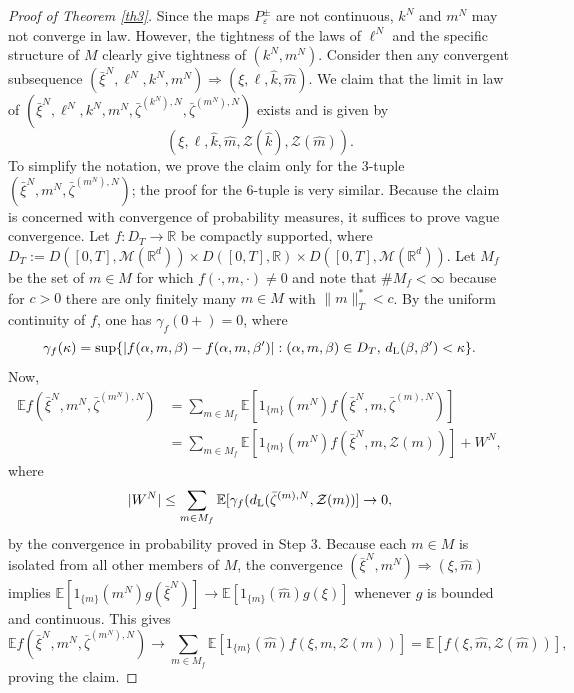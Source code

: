 \documentclass[11pt]{amsart}
\theoremstyle{plain}
\newcommand{\eps}{\varepsilon}
\newcommand{\al}{\alpha}
\newcommand{\gam}{\gamma}
\newcommand{\kap}{\kappa}
\newcommand{\R}{{\mathbb R}}
\newcommand{\EE}{{\mathbb E}}
\newcommand{\E}{{\mathbb E}}
\newcommand{\calM}{{\mathcal M}}
\newcommand{\calZ}{{\mathcal Z}}
\newcommand{\To}{\Rightarrow}
\newcommand{\iy}{\infty}
\begin{document}
\begin{proof}[Proof of Theorem \ref{th3}]

Since the maps $P^\pm_\eps$ are not continuous,
$k^N$ and $m^N$ may not converge in law. However, the tightness
of the laws of $\ell^N$ and the specific structure of $M$
clearly give tightness of $(k^N,m^N)$. Consider then any convergent subsequence
$(\bar\xi^N,\ell^N,k^N,m^N)\To(\xi,\ell,\hat k,\hat m)$.
We claim that the limit in law of
$(\bar\xi^N,\ell^N,k^N,m^N,\bar\zeta^{(k^N),N},\bar\zeta^{(m^N),N})$
exists and is given by
\[
(\xi,\ell,\hat k,\hat m,\calZ(\hat k),\calZ(\hat m)).
\]
To simplify the notation, we prove the claim only for the 3-tuple
$(\bar\xi^N,m^N,\bar\zeta^{(m^N),N})$;
the proof for the 6-tuple is very similar.
Because the claim is concerned with convergence
of probability measures, it suffices to prove vague convergence.
Let $f:D_T\to\R$ be compactly supported, where
$D_T:=D([0,T],\calM(\R^d))\times D([0,T],\R)\times D([0,T],\calM(\R^d))$.
Let $M_f$ be the set of $m\in M$ for which $f(\cdot,m,\cdot)\ne0$
and note that $\# M_f<\iy$ because
for $c>0$ there are only finitely many $m\in M$ with
$\|m\|^*_T<c$. By the uniform continuity of $f$, one has
$\gam_f(0+)=0$, where
\[
\gam_f(\kap)=\sup\{|f(\al,m,\beta)-f(\al,m,\beta')|:
(\al,m,\beta)\in D_T,\,d_{\rm L}(\beta,\beta')<\kap\}.
\]
Now,
\begin{align*}
\E f(\bar\xi^N,m^N,\bar\zeta^{(m^N),N})
&=\sum_{m\in M_f}\E[1_{\{m\}}(m^N) f(\bar\xi^N,m,\bar\zeta^{(m),N})]
\\
&=
\sum_{m\in M_f}\E[1_{\{m\}}(m^N) f(\bar\xi^N,m,\calZ(m))]
+W^N,
\end{align*}
where
\[
|W^N|\le\sum_{m\in M_f}\EE[\gam_f(d_{\rm L}(\bar\zeta^{(m),N},
\calZ(m))]\to0,
\]
by the convergence in probability proved in Step 3.
Because each $m\in M$ is isolated from all other members of $M$,
the convergence $(\bar\xi^N,m^N)\To(\xi,\hat m)$
implies $\E[1_{\{m\}}(m^N)g(\bar\xi^N)]
\to\E[1_{\{m\}}(\hat m)g(\xi)]$ whenever $g$ is bounded and continuous.
This gives
\[
\E f(\bar\xi^N,m^N,\bar\zeta^{(m^N),N})
\to\sum_{m\in M_f}\E[1_{\{m\}}(\hat m)f(\xi,m,\calZ(m))]
=\E[f(\xi,\hat m,\calZ(\hat m))],
\]
proving the claim.


\end{proof}
\end{document}

